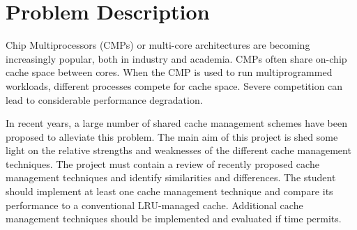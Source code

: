 
\section*{Problem Description}
Chip Multiprocessors (CMPs) or multi-core architectures are becoming increasingly popular, both in industry and academia. 
CMPs often share on-chip cache space between cores. 
When the CMP is used to run multiprogrammed workloads, different processes compete for cache space. 
Severe competition can lead to considerable performance degradation. 

In recent years, a large number of shared cache management schemes have been proposed to alleviate this problem.
The main aim of this project is shed some light on the relative strengths and weaknesses of the different cache management techniques. 
The project must contain a review of recently proposed cache management techniques and identify similarities and differences. 
The student should implement at least one cache management technique and compare its performance to a conventional LRU-managed cache.
Additional cache management techniques should be implemented and evaluated if time permits.

\clearpage
